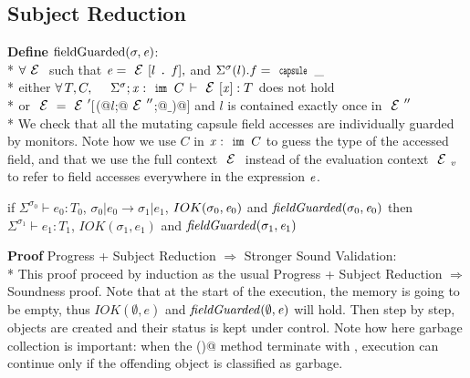 \subsection{Subject Reduction}

\noindent\textbf{Define} $\text{fieldGuarded}(\sigma,\e)$:\\*
${}_{}$\quad\quad$\forall \ctx$ such that $\e=\ctx[l\singleDot\f], $
and $\Sigma^\sigma(l).f=\Kw{capsule}\,\_$\\*
${}_{}$\quad\quad\quad either $\forall\, T,C,\quad\ \Sigma^\sigma;\x:\Kw{imm}\,C\,\vdash\ctx[\x]:T$ does not hold\\*
${}_{}$\quad\quad\quad or $\ctx=\ctx'[$\Q@M(@$l$\Q@;@$\ctx''$\Q@;@$\_$\Q@)@$]$ and $l$ is contained exactly once in $\ctx''$ \\*
\noindent We check that all the mutating capsule field accesses
are individually guarded by monitors.
Note how we use $C$ in $\x:\Kw{imm}\,C$ to guess the type of the accessed field,
and that we use the full context $\ctx$ instead of the evaluation context $\ctx_v$
to refer to field accesses everywhere in the expression ${\mathit{e}}$.



\begin{Theorem}
if $\Sigma^{\sigma_0}\vdash e_0: T_0$,
$\sigma_0|e_0\rightarrow \sigma_1|e_1$,
$IOK(\sigma_0,\e_0)$
and
$\mathit{fieldGuarded}(\sigma_0,\e_0)$
then
$\Sigma^{\sigma_1}\vdash e_1: T_1$,
$IOK(\sigma_1,e_1)$ and
$\mathit{fieldGuarded}(\sigma_1,\e_1)$
\end{Theorem}

\noindent\textbf{Proof }Progress + Subject Reduction $\Rightarrow$ Stronger Sound Validation:\\*
This proof proceed by induction as the usual Progress + Subject Reduction $\Rightarrow$ Soundness
proof.
Note that at the start of the execution, the memory is going to be empty, thus
$IOK(\emptyset,e)$  and $\mathit{fieldGuarded}(\emptyset,{\mathit{e}})$
will hold.
Then step by step, objects are created and their status is kept under control.
Note how here garbage collection is important: 
when the \Q@validate()@ method terminate with \Q@false@, 
execution can continue only if the offending object is classified as garbage.

